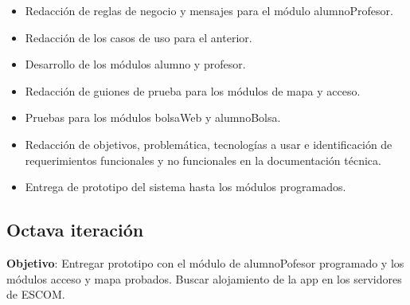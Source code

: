\begin{itemize}
	\item Redacción de reglas de negocio y mensajes para el módulo alumnoProfesor.
	\item Redacción de los casos de uso para el anterior.
	\item Desarrollo de los módulos alumno y profesor.
	\item Redacción de guiones de prueba para los módulos de mapa y acceso.
	\item Pruebas para los módulos bolsaWeb y alumnoBolsa.
	\item Redacción de objetivos, problemática, tecnologías a usar e identificación de requerimientos funcionales y no funcionales en la documentación técnica.
	\item Entrega de prototipo del sistema hasta los módulos programados.
\end{itemize}


\subsection{Octava iteración}

\noindent
\textbf{Objetivo}: Entregar prototipo con el módulo de alumnoPofesor programado y los módulos acceso y mapa probados. Buscar alojamiento de la app en los servidores de ESCOM. 
\newline


